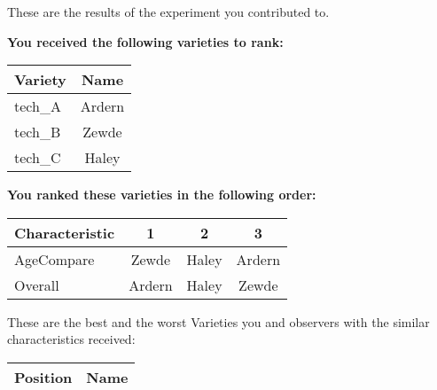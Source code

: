 \documentclass[10pt]{article}
\begin{document}
\begin{titlepage}
	These are the results of the experiment you contributed to.

	\begin{flushleft}
		\textbf{You received the following varieties to rank: }\hfill \break
		\begin{tabularx}{\textwidth}{ X | c  }
			\hline
			\textbf{Variety} & \textbf{Name} \\ \hline

			
				tech\_A & Ardern \\ \hline
			
				tech\_B & Zewde \\ \hline
			
				tech\_C & Haley \\ \hline
			


		\end{tabularx}\newline \newline

		\textbf{You ranked these varieties in the following order: }\hfill \break
		\begin{tabularx}{\textwidth}{ X | c | c | c  }
			\hline
			\textbf{Characteristic}
			
				& \textbf{ 1 }
			
				& \textbf{ 2 }
			
				& \textbf{ 3 }
			
			\\ \hline


			
				AgeCompare & Zewde  & Haley  & Ardern  \\ \hline


			
				Overall & Ardern  & Haley  & Zewde  \\ \hline


			

		\end{tabularx}

	\end{flushleft}

	\pagebreak

	\begin{flushleft}
		These are the best and the worst Varieties you and observers with the similar characteristics received:\hfill \break \newline
		\begin{tabularx}{\textwidth}{ X | X  }
			\hline
			\textbf{Position} & \textbf{Name} \\ \hline


\end{tabularx}
\end{flushleft}
\end{titlepage}
\end{document}
